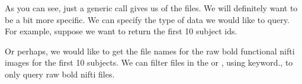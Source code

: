 \documentclass[letterpaper,10pt,english]{sphinxmanual}
\begin{document}
As you can see, just a generic  call gives us  of the files. We will definitely want to be a bit more specific. We can specify the type of data we would like to query. For example, suppose we want to return the first 10 subject ids.

\begin{sphinxVerbatim}[commandchars=\\\{\}]
 \PYG{p}{[}\PYG{p}{]}
\end{sphinxVerbatim}

\begin{sphinxVerbatim}
\end{sphinxVerbatim}

Or perhaps, we would like to get the file names for the raw bold functional nifti images for the first 10 subjects. We can filter files in the  or , using  keyword., to only query raw bold nifti files.

\begin{sphinxVerbatim}[commandchars=\\\{\}]
   \PYG{p}{[}\PYG{p}{]}
\end{sphinxVerbatim}
\end{document}
